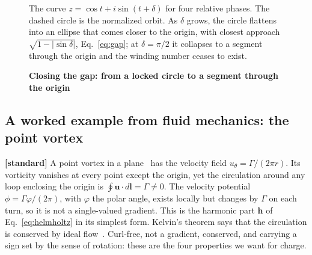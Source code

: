 \documentclass[%
 reprint, amsmath,amssymb, aps, prb, ]{revtex4-2}
\numberwithin{equation}{section}
\begin{document}
\begin{figure}[t!]
\centering
{}
\caption{\textbf{Closing the gap: from a locked circle to a segment through the origin}}
\label{fig:delta}
\vspace{0.4em}
\begin{minipage}{0.95\textwidth}
\justifying\small
The curve $z=\cos t+i\sin(t+\delta)$ for four relative phases. The dashed circle is the normalized orbit. As $\delta$ grows, the circle flattens into an ellipse that comes closer to the origin, with closest approach $\sqrt{1-|\sin\delta|}$, Eq.~\eqref{eq:gap}; at $\delta=\pi/2$ it collapses to a segment through the origin and the winding number ceases to exist.
\end{minipage}
\end{figure}

\subsection{A worked example from fluid mechanics: the point vortex}

\textbf{[standard]} A point vortex in a plane~\cite{ref:batchelor,ref:saffman} has the velocity field $u_\theta=\Gamma/(2\pi r)$. Its vorticity vanishes at every point except the origin, yet the circulation around any loop enclosing the origin is $\oint\mathbf{u}\cdot d\mathbf{l}=\Gamma\neq0$. The velocity potential $\phi=\Gamma\varphi/(2\pi)$, with $\varphi$ the polar angle, exists locally but changes by $\Gamma$ on each turn, so it is not a single-valued gradient. This is the harmonic part $\mathbf{h}$ of Eq.~\eqref{eq:helmholtz} in its simplest form. Kelvin's theorem says that the circulation is conserved by ideal flow~\cite{ref:kelvin}. Curl-free, not a gradient, conserved, and carrying a sign set by the sense of rotation: these are the four properties we want for charge.
\end{document}
